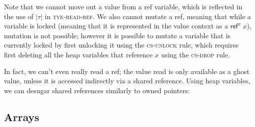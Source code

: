 \documentclass[acmsmall,nonacm]{acmart}
\newcommand*{\N}{\mathbb{N}}
\newcommand{\core}[1]{\left| #1 \right|}
\newcommand{\proves}{\vdash}
\newcommand{\makes}{\dashv}
\newcommand{\constep}{\proves\cdot\makes}
\newcommand*{\axiom}[2][]{\infer[#1]{}{#2}}
\begin{document}

Note that we cannot move out a value from a ref variable, which is reflected in the use of $\core\tau$ in \textsc{tye-read-ref}. We also cannot mutate a ref, meaning that while a variable is locked (meaning that it is represented in the value context as a $\mathsf{ref}^x\;x$), mutation is not possible; however it is possible to mutate a variable that is currently locked by first unlocking it using the \textsc{cs-unlock} rule, which requires first deleting all the heap variables that reference $x$ using the \textsc{cs-drop} rule.

In fact, we can't even really read a ref; the value read is only available as a ghost value, unless it is accessed indirectly via a shared reference. Using heap variables, we can desugar shared references similarly to owned pointers:


\subsection{Arrays}\label{sec:arrays}
\end{document}
